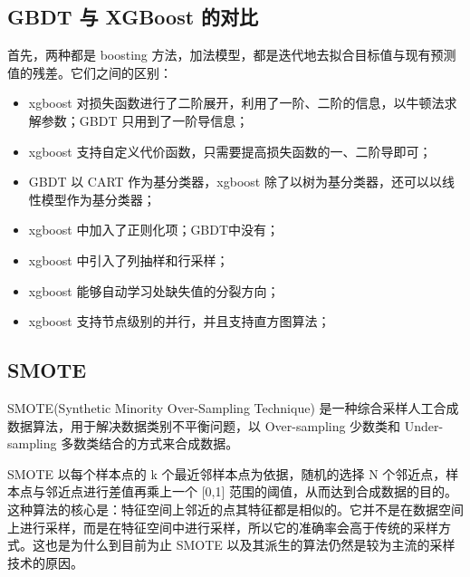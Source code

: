 \subsection{GBDT 与 XGBoost 的对比}
首先，两种都是 boosting 方法，加法模型，都是迭代地去拟合目标值与现有预测值的残差。它们之间的区别：
\begin{itemize}
	\item xgboost 对损失函数进行了二阶展开，利用了一阶、二阶的信息，以牛顿法求解参数；GBDT 只用到了一阶导信息；
	
	\item xgboost 支持自定义代价函数，只需要提高损失函数的一、二阶导即可；
	
	\item GBDT 以 CART 作为基分类器，xgboost 除了以树为基分类器，还可以以线性模型作为基分类器；
	
	\item xgboost 中加入了正则化项；GBDT中没有；
	
	\item xgboost 中引入了列抽样和行采样；
	
	\item xgboost 能够自动学习处缺失值的分裂方向；
	
	\item xgboost 支持节点级别的并行，并且支持直方图算法；
\end{itemize}

\subsection{SMOTE}
SMOTE(Synthetic Minority Over-Sampling Technique) 是一种综合采样人工合成数据算法，用于解决数据类别不平衡问题，以 Over-sampling 少数类和 Under-sampling 多数类结合的方式来合成数据。

SMOTE 以每个样本点的 k 个最近邻样本点为依据，随机的选择 N 个邻近点，样本点与邻近点进行差值再乘上一个 [0,1] 范围的阈值，从而达到合成数据的目的。这种算法的核心是：特征空间上邻近的点其特征都是相似的。它并不是在数据空间上进行采样，而是在特征空间中进行采样，所以它的准确率会高于传统的采样方式。这也是为什么到目前为止 SMOTE 以及其派生的算法仍然是较为主流的采样技术的原因。